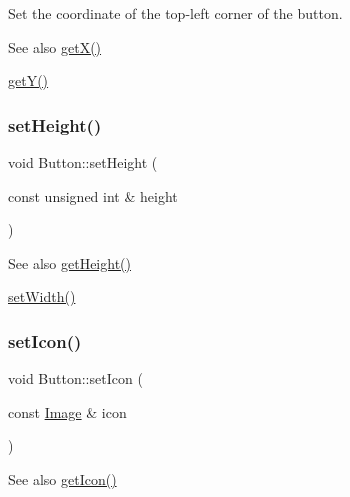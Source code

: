 Set the coordinate of the top-\/left corner of the button. 

\begin{DoxySeeAlso}{See also}
\mbox{\hyperlink{class_button_a05c6aae1cf037ad66e3821963fe72988}{get\+X()}} 

\mbox{\hyperlink{class_button_a3acf216100c43b999e38047bfdf99ee7}{get\+Y()}} 
\end{DoxySeeAlso}
\mbox{\label{class_button_a6b048681f073eae03631251ddee96b17}} 
\subsubsection{\texorpdfstring{set\+Height()}{setHeight()}}
{\footnotesize\ttfamily void Button\+::set\+Height (\begin{DoxyParamCaption}\item[{const unsigned int \&}]{height }\end{DoxyParamCaption})\hspace{0.3cm}{\ttfamily [virtual]}}

\begin{DoxySeeAlso}{See also}
\mbox{\hyperlink{class_button_ab4e3a35e683df269eb4b178632694dbf}{get\+Height()}} 

\mbox{\hyperlink{class_button_a77d90f51ba19a275e9d662cbb081049f}{set\+Width()}} 
\end{DoxySeeAlso}
\mbox{\label{class_button_aabe6ae612c78c4e49d6c4de222e3dcb2}} 
\subsubsection{\texorpdfstring{set\+Icon()}{setIcon()}}
{\footnotesize\ttfamily void Button\+::set\+Icon (\begin{DoxyParamCaption}\item[{const \mbox{\hyperlink{class_image}{Image}} \&}]{icon }\end{DoxyParamCaption})\hspace{0.3cm}{\ttfamily [virtual]}}

\begin{DoxySeeAlso}{See also}
\mbox{\hyperlink{class_button_afc946623026b3f18de86af8e4cc2921e}{get\+Icon()}} 
\end{DoxySeeAlso}
\mbox{\label{class_button_aca4632ad68e021d147966c8782917f83}} 

